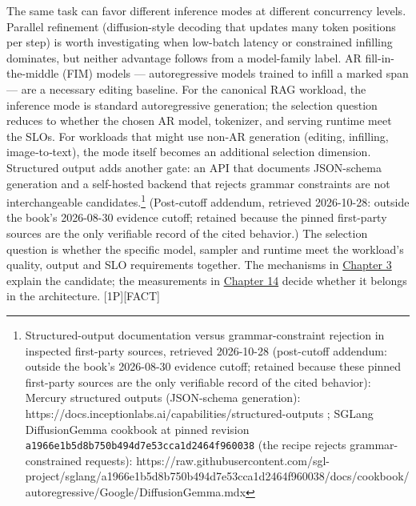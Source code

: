 The same task can favor different inference modes at different
concurrency levels. Parallel refinement (diffusion-style decoding that
updates many token positions per step) is worth investigating when
low-batch latency or constrained infilling dominates, but neither
advantage follows from a model-family label. AR fill-in-the-middle (FIM)
models --- autoregressive models trained to infill a marked span --- are
a necessary editing baseline. For the canonical RAG workload, the
inference mode is standard autoregressive generation; the selection
question reduces to whether the chosen AR model, tokenizer, and serving
runtime meet the SLOs. For workloads that might use non‑AR generation
(editing, infilling, image‑to‑text), the mode itself becomes an
additional selection dimension. Structured output adds another gate: an
API that documents JSON-schema generation and a self-hosted backend that
rejects grammar constraints are not interchangeable
candidates.\footnote{Structured-output documentation versus
  grammar-constraint rejection in inspected first-party sources,
  retrieved 2026-10-28 (post-cutoff addendum: outside the book's
  2026-08-30 evidence cutoff; retained because these pinned first-party
  sources are the only verifiable record of the cited behavior): Mercury
  structured outputs (JSON-schema generation):
  https://docs.inceptionlabs.ai/capabilities/structured-outputs ; SGLang
  DiffusionGemma cookbook at pinned revision
  \texttt{a1966e1b5d8b750b494d7e53cca1d2464f960038} (the recipe rejects
  grammar-constrained requests):
  https://raw.githubusercontent.com/sgl-project/sglang/a1966e1b5d8b750b494d7e53cca1d2464f960038/docs/cookbook/autoregressive/Google/DiffusionGemma.mdx}
(Post-cutoff addendum, retrieved 2026-10-28: outside the book's
2026-08-30 evidence cutoff; retained because the pinned first-party
sources are the only verifiable record of the cited behavior.) The
selection question is whether the specific model, sampler and runtime
meet the workload's quality, output and SLO requirements together. The
mechanisms in \hyperref[chap:3]{Chapter 3} explain the candidate; the measurements in
\hyperref[chap:14]{Chapter 14} decide whether it belongs in the architecture.
\mbox{{[}1P{]}}\hspace{0pt}\mbox{{[}FACT{]}}

\label{mental-model}


